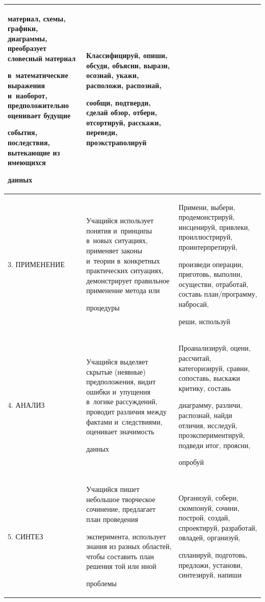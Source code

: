 \begin{table}
\begin{center}
\begin{tabular}{|l|p{60mm}|p{66mm}|}
материал, схемы, графики, диаграммы, преобразует словесный материал


в~математические выражения и~наоборот, предположительно оценивает будущие\linebreak


события, последствия, вытекающие из имеющихся


данных&Классифицируй, опиши, обсуди, объясни, вырази, осознай, укажи, расположи, распознай,


сообщи, подтверди, сделай обзор, отбери, отсортируй, расскажи, переведи, проэкстраполируй\\


\hline


3. ПРИМЕНЕНИЕ&Учащийся использует понятия и~принципы в~новых ситуациях, применяет законы и~теории в~конкретных практических ситуациях, демонстрирует правильное применение метода или


процедуры


&Примени, выбери, продемонстрируй, инсценируй, привлеки, проиллюстрируй, проинтерпретируй,


произведи операции, приготовь, выполни, осуществи, отработай, составь план/программу, набросай,


реши, используй\\


\hline


4. АНАЛИЗ&Учащийся выделяет скрытые (неявные) предположения, видит ошибки и~упущения в~логике рассуждений, проводит различия между фактами и~следствиями, оценивает значимость


данных&Проанализируй, оцени, рассчитай, категоризируй, сравни, сопоставь, выскажи критику, составь


диаграмму, различи, распознай, \mbox{найди} отличия, исследуй, проэкспериментируй, подведи итог, проясни,


опробуй\\


\hline


5. СИНТЕЗ&Учащийся пишет небольшое творческое сочинение, предлагает план проведения


эксперимента, использует знания из разных областей, чтобы составить план решения той или иной


проблемы


&Организуй, собери, скомпонуй, сочини, построй, создай, спроектируй, разработай, овладей, организуй,


спланируй, подготовь, предложи, установи, синтезируй, напиши



\end{tabular}
\end{center}
\end{table}

